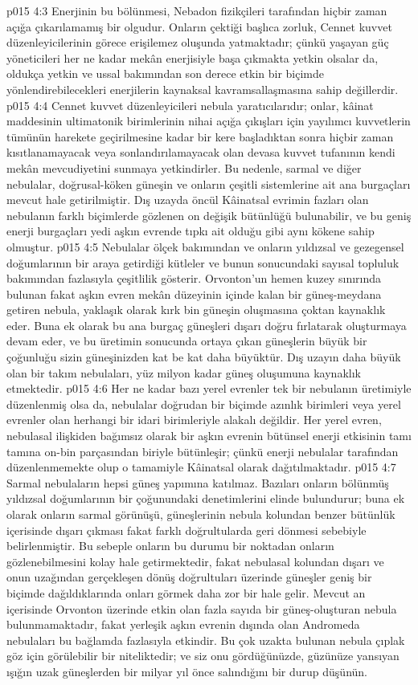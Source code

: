 \vs p015 4:3 Enerjinin bu bölünmesi, Nebadon fizikçileri tarafından hiçbir zaman açığa çıkarılamamış bir olgudur. Onların çektiği başlıca zorluk, Cennet kuvvet düzenleyicilerinin görece erişilemez oluşunda yatmaktadır; çünkü yaşayan güç yöneticileri her ne kadar mekân enerjisiyle başa çıkmakta yetkin olsalar da, oldukça yetkin ve ussal bakımından son derece etkin bir biçimde yönlendirebilecekleri enerjilerin kaynaksal kavramsallaşmasına sahip değillerdir.
\vs p015 4:4 Cennet kuvvet düzenleyicileri nebula yaratıcılarıdır; onlar, kâinat maddesinin ultimatonik birimlerinin nihai açığa çıkışları için yayılımcı kuvvetlerin tümünün harekete geçirilmesine kadar bir kere başladıktan sonra hiçbir zaman kısıtlanamayacak veya sonlandırılamayacak olan devasa kuvvet tufanının kendi mekân mevcudiyetini sunmaya yetkindirler. Bu nedenle, sarmal ve diğer nebulalar, doğrusal\hyp{}köken güneşin ve onların çeşitli sistemlerine ait ana burgaçları mevcut hale getirilmiştir. Dış uzayda öncül Kâinatsal evrimin fazları olan nebulanın farklı biçimlerde gözlenen on değişik bütünlüğü bulunabilir, ve bu geniş enerji burgaçları yedi aşkın evrende tıpkı ait olduğu gibi aynı kökene sahip olmuştur.
\vs p015 4:5 Nebulalar ölçek bakımından ve onların yıldızsal ve gezegensel doğumlarının bir araya getirdiği kütleler ve bunun sonucundaki sayısal topluluk bakımından fazlasıyla çeşitlilik gösterir. Orvonton’un hemen kuzey sınırında bulunan fakat aşkın evren mekân düzeyinin içinde kalan bir güneş\hyp{}meydana getiren nebula, yaklaşık olarak kırk bin güneşin oluşmasına çoktan kaynaklık eder. Buna ek olarak bu ana burgaç güneşleri dışarı doğru fırlatarak oluşturmaya devam eder, ve bu üretimin sonucunda ortaya çıkan güneşlerin büyük bir çoğunluğu sizin güneşinizden kat be kat daha büyüktür. Dış uzayın daha büyük olan bir takım nebulaları, yüz milyon kadar güneş oluşumuna kaynaklık etmektedir.
\vs p015 4:6 Her ne kadar bazı yerel evrenler tek bir nebulanın üretimiyle düzenlenmiş olsa da, nebulalar doğrudan bir biçimde azınlık birimleri veya yerel evrenler olan herhangi bir idari birimleriyle alakalı değildir. Her yerel evren, nebulasal ilişkiden bağımsız olarak bir aşkın evrenin bütünsel enerji etkisinin tamı tamına on\hyp{}bin parçasından biriyle bütünleşir; çünkü enerji nebulalar tarafından düzenlenmemekte olup o tamamiyle Kâinatsal olarak dağıtılmaktadır.
\vs p015 4:7 Sarmal nebulaların hepsi güneş yapımına katılmaz. Bazıları onların bölünmüş yıldızsal doğumlarının bir çoğunundaki denetimlerini elinde bulundurur; buna ek olarak onların sarmal görünüşü, güneşlerinin nebula kolundan benzer bütünlük içerisinde dışarı çıkması fakat farklı doğrultularda geri dönmesi sebebiyle belirlenmiştir. Bu sebeple onların bu durumu bir noktadan onların gözlenebilmesini kolay hale getirmektedir, fakat nebulasal kolundan dışarı ve onun uzağından gerçekleşen dönüş doğrultuları üzerinde güneşler geniş bir biçimde dağıldıklarında onları görmek daha zor bir hale gelir. Mevcut an içerisinde Orvonton üzerinde etkin olan fazla sayıda bir güneş\hyp{}oluşturan nebula bulunmamaktadır, fakat yerleşik aşkın evrenin dışında olan Andromeda nebulaları bu bağlamda fazlasıyla etkindir. Bu çok uzakta bulunan nebula çıplak göz için görülebilir bir niteliktedir; ve siz onu gördüğünüzde, güzünüze yansıyan ışığın uzak güneşlerden bir milyar yıl önce salındığını bir durup düşünün.
